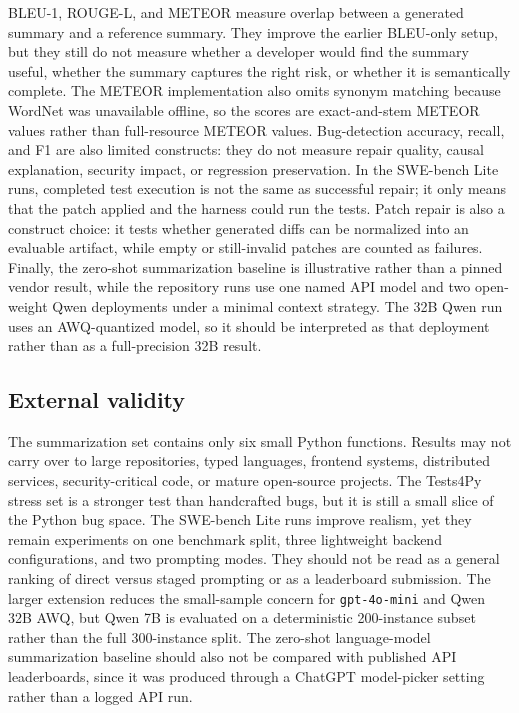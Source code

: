 \documentclass[preprint,12pt]{elsarticle}
\begin{document}
BLEU-1, ROUGE-L, and METEOR measure overlap between a generated summary and a reference summary. They improve the earlier BLEU-only setup, but they still do not measure whether a developer would find the summary useful, whether the summary captures the right risk, or whether it is semantically complete. The METEOR implementation also omits synonym matching because WordNet was unavailable offline, so the scores are exact-and-stem METEOR values rather than full-resource METEOR values. Bug-detection accuracy, recall, and F1 are also limited constructs: they do not measure repair quality, causal explanation, security impact, or regression preservation. In the SWE-bench Lite runs, completed test execution is not the same as successful repair; it only means that the patch applied and the harness could run the tests. Patch repair is also a construct choice: it tests whether generated diffs can be normalized into an evaluable artifact, while empty or still-invalid patches are counted as failures. Finally, the zero-shot summarization baseline is illustrative rather than a pinned vendor result, while the repository runs use one named API model and two open-weight Qwen deployments under a minimal context strategy. The 32B Qwen run uses an AWQ-quantized model, so it should be interpreted as that deployment rather than as a full-precision 32B result.

\subsection{External validity}

The summarization set contains only six small Python functions. Results may not carry over to large repositories, typed languages, frontend systems, distributed services, security-critical code, or mature open-source projects. The Tests4Py stress set is a stronger test than handcrafted bugs, but it is still a small slice of the Python bug space. The SWE-bench Lite runs improve realism, yet they remain experiments on one benchmark split, three lightweight backend configurations, and two prompting modes. They should not be read as a general ranking of direct versus staged prompting or as a leaderboard submission. The larger extension reduces the small-sample concern for \texttt{gpt-4o-mini} and Qwen 32B AWQ, but Qwen 7B is evaluated on a deterministic 200-instance subset rather than the full 300-instance split. The zero-shot language-model summarization baseline should also not be compared with published API leaderboards, since it was produced through a ChatGPT model-picker setting rather than a logged API run.
\end{document}
